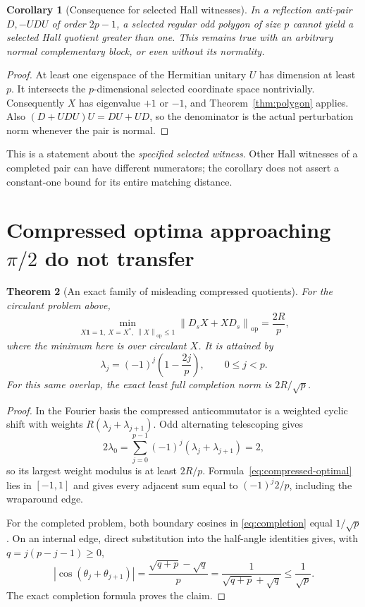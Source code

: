 \documentclass[11pt]{article}
\newtheorem{theorem}{Theorem}[section]
\newtheorem{corollary}[theorem]{Corollary}
\theoremstyle{remark}
\newcommand{\op}{\mathrm{op}}
\newcommand{\norm}[1]{\left\lVert#1\right\rVert_{\op}}
\begin{document}
\begin{corollary}[Consequence for selected Hall witnesses]\label{cor:hall}
In a reflection anti-pair $D,-UDU$ of order $2p-1$, a selected regular odd polygon of size $p$ cannot yield a selected Hall quotient greater than one. This remains true with an arbitrary normal complementary block, or even without its normality.
\end{corollary}
\begin{proof}
At least one eigenspace of the Hermitian unitary $U$ has dimension at least $p$. It intersects the $p$-dimensional selected coordinate space nontrivially. Consequently $X$ has eigenvalue $+1$ or $-1$, and Theorem~\ref{thm:polygon} applies. Also $(D+UDU)U=DU+UD$, so the denominator is the actual perturbation norm whenever the pair is normal.
\end{proof}

This is a statement about the \emph{specified selected witness}. Other Hall witnesses of a completed pair can have different numerators; the corollary does not assert a constant-one bound for its entire matching distance.

\section{Compressed optima approaching $\pi/2$ do not transfer}
\begin{theorem}[An exact family of misleading compressed quotients]\label{thm:misleading}
For the circulant problem above,
\[
 \min_{X\mathbf1=\mathbf1,\ X=X^*,\ \norm X\le1}
 \norm{D_sX+XD_s}=\frac{2R}{p},
\]
where the minimum here is over circulant $X$. It is attained by
\begin{equation}\label{eq:compressed-optimal}
 \lambda_j=(-1)^j\left(1-\frac{2j}{p}\right),\qquad 0\le j<p.
\end{equation}
For this same overlap, the exact least full completion norm is $2R/\sqrt p$.
\end{theorem}
\begin{proof}
In the Fourier basis the compressed anticommutator is a weighted cyclic shift with weights $R(\lambda_j+\lambda_{j+1})$. Odd alternating telescoping gives
\[
 2\lambda_0=\sum_{j=0}^{p-1}(-1)^j(\lambda_j+\lambda_{j+1})=2,
\]
so its largest weight modulus is at least $2R/p$. Formula~\eqref{eq:compressed-optimal} lies in $[-1,1]$ and gives every adjacent sum equal to $(-1)^j2/p$, including the wraparound edge.

For the completed problem, both boundary cosines in \eqref{eq:completion} equal $1/\sqrt p$. On an internal edge, direct substitution into the half-angle identities gives, with $q=j(p-j-1)\ge0$,
\[
 |\cos(\theta_j+\theta_{j+1})|
 =\frac{\sqrt{q+p}-\sqrt q}{p}
 =\frac1{\sqrt{q+p}+\sqrt q}\le\frac1{\sqrt p}.
\]
The exact completion formula proves the claim.
\end{proof}
\end{document}
